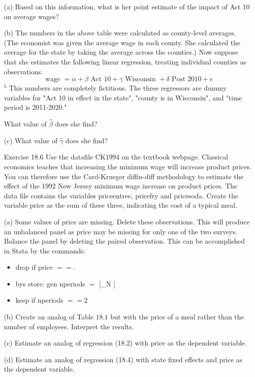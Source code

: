 \documentclass[10pt]{article}
\begin{document}
(a) Based on this information, what is her point estimate of the impact of Act 10 on average wages?

(b) The numbers in the above table were calculated as county-level averages. (The economist was given the average wage in each county. She calculated the average for the state by taking the average across the counties.) Now suppose that she estimates the following linear regression, treating individual counties as observations.
$$
\text { wage }=\alpha+\beta \text { Act } 10+\gamma \text { Wisconsin }+\delta \text { Post } 2010+e
$$
${ }^{5}$ This numbers are completely fictitious. The three regressors are dummy variables for "Act 10 in effect in the state", "county is in Wisconsin", and "time period is 2011-2020."

What value of $\widehat{\beta}$ does she find?

(c) What value of $\widehat{\gamma}$ does she find?

Exercise 18.6 Use the datafile CK1994 on the textbook webpage. Classical economics teaches that increasing the minimum wage will increase product prices. You can therefore use the Card-Krueger diffin-diff methodology to estimate the effect of the 1992 New Jersey minimum wage increase on product prices. The data file contains the variables priceentree, pricefry and pricesoda. Create the variable price as the sum of these three, indicating the cost of a typical meal.

(a) Some values of price are missing. Delete these observations. This will produce an unbalanced panel as price may be missing for only one of the two surveys. Balance the panel by deleting the paired observation. This can be accomplished in Stata by the commands:

\begin{itemize}
  \item drop if price $==$.

  \item bys store: gen nperiods $=$ [\_N $]$

  \item keep if nperiods $==2$

\end{itemize}
(b) Create an analog of Table $18.1$ but with the price of a meal rather than the number of employees. Interpret the results.

(c) Estimate an analog of regression (18.2) with price as the dependent variable.

(d) Estimate an analog of regression (18.4) with state fixed effects and price as the dependent variable.
\end{document}
